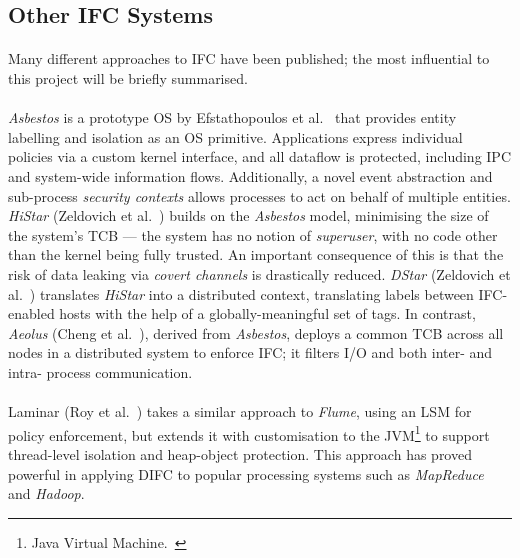 \subsection{Other IFC Systems}
\paragraph{} Many different approaches to IFC have been published; the most influential to this project will be briefly summarised.

\paragraph{} \textit{Asbestos} is a prototype OS by Efstathopoulos et al.~\cite{asbestos} that provides entity labelling and isolation as an OS primitive. Applications express individual policies via a custom kernel interface, and all dataflow is protected, including IPC and system-wide information flows. Additionally, a novel event abstraction and sub-process \textit{security contexts} allows processes to act on behalf of multiple entities. \textit{HiStar} (Zeldovich et al.~\cite{10.5555/1298455.1298481}) builds on the \textit{Asbestos} model, minimising the size of the system's TCB --- the system has no notion of \textit{superuser}, with no code other than the kernel being fully trusted. An important consequence of this is that the risk of data leaking via \textit{covert channels} is drastically reduced. \textit{DStar} (Zeldovich et al.~\cite{10.5555/1387589.1387610}) translates \textit{HiStar} into a distributed context, translating labels between IFC-enabled hosts with the help of a globally-meaningful set of tags. In contrast, \textit{Aeolus} (Cheng et al.~\cite{10.5555/2342821.2342833}), derived from \textit{Asbestos}, deploys a common TCB across all nodes in a distributed system to enforce IFC; it filters I/O and both inter- and intra- process communication.

\paragraph{} Laminar (Roy et al.~\cite{10.1145/1543135.1542484}) takes a similar approach to \textit{Flume}, using an LSM for policy enforcement, but extends it with customisation to the JVM\footnote{Java Virtual Machine.~\cite{jvm}} to support thread-level isolation and heap-object protection. This approach has proved powerful in applying DIFC to popular processing systems such as \textit{MapReduce}~\cite{mapreduce} and \textit{Hadoop}.~\cite{hadoop}


